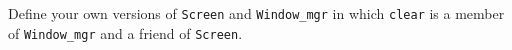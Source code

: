 %
%
\begin{question}
Define your own versions of \verb|Screen| and \verb|Window_mgr| in
which \verb|clear| is a member of \verb|Window_mgr| and a friend of \verb|Screen|.
\end{question}
